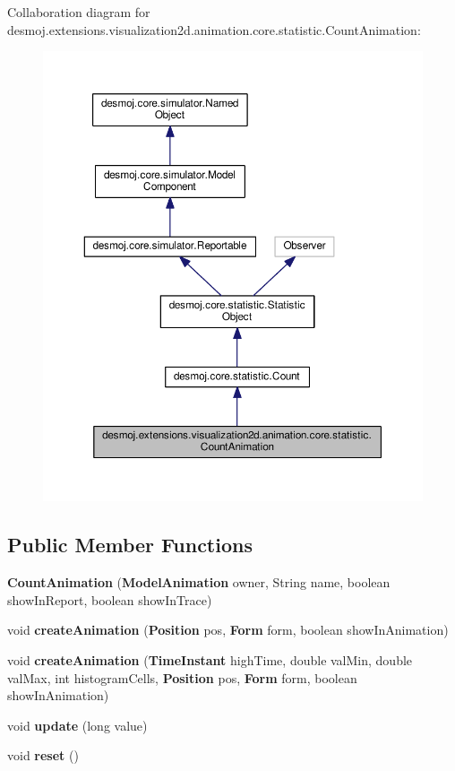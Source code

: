 Collaboration diagram for desmoj.\-extensions.\-visualization2d.\-animation.\-core.\-statistic.\-Count\-Animation\-:
\nopagebreak
\begin{figure}[H]
\begin{center}
\leavevmode
\includegraphics[width=350pt]{classdesmoj_1_1extensions_1_1visualization2d_1_1animation_1_1core_1_1statistic_1_1_count_animation__coll__graph}
\end{center}
\end{figure}
\subsection*{Public Member Functions}
\begin{DoxyCompactItemize}
\item 
{\bf Count\-Animation} ({\bf Model\-Animation} owner, String name, boolean show\-In\-Report, boolean show\-In\-Trace)
\item 
void {\bf create\-Animation} ({\bf Position} pos, {\bf Form} form, boolean show\-In\-Animation)
\item 
void {\bf create\-Animation} ({\bf Time\-Instant} high\-Time, double val\-Min, double val\-Max, int histogram\-Cells, {\bf Position} pos, {\bf Form} form, boolean show\-In\-Animation)
\item 
void {\bf update} (long value)
\item 
void {\bfseries reset} ()\label{classdesmoj_1_1extensions_1_1visualization2d_1_1animation_1_1core_1_1statistic_1_1_count_animation_af0aff23fbf2c69532eaa2e23b1714e75}

\end{DoxyCompactItemize}

